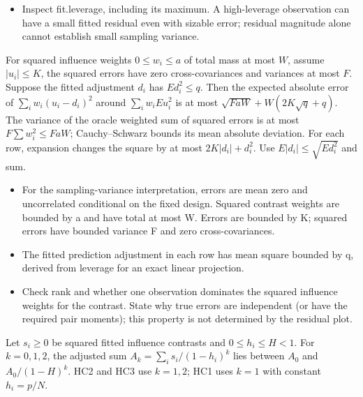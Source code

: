 \expandafter\def\csname statadic@diagnostics@STATADIC-HC-001\endcsname{\begin{itemize}
\item Inspect fit.leverage, including its maximum. A high-leverage observation can have a small fitted residual even with sizable error; residual magnitude alone cannot establish small sampling variance.
\end{itemize}}
\expandafter\def\csname statadic@statement@STATADIC-HC-002\endcsname{For squared influence weights $0\le w_i\le a$ of
  total mass at most $W$, assume $|u_i|\le K$, the squared errors have
  zero cross-covariances and variances at most $F$. Suppose the fitted
  adjustment $d_i$ has $E d_i^2\le q$. Then the expected absolute error
  of $\sum_i w_i(u_i-d_i)^2$ around $\sum_i w_iE u_i^2$ is at most
  $\sqrt{FaW}+W(2K\sqrt q+q)$.}
\expandafter\def\csname statadic@proof@STATADIC-HC-002\endcsname{The variance of the oracle weighted sum of squared errors
  is at most $F\sum w_i^2\le FaW$; Cauchy--Schwarz bounds its mean absolute
  deviation. For each row, expansion changes the square by at most
  $2K|d_i|+d_i^2$. Use $E|d_i|\le\sqrt{E d_i^2}$ and sum.}
\expandafter\def\csname statadic@assumptions@STATADIC-HC-002\endcsname{\begin{itemize}
\item For the sampling-variance interpretation, errors are mean zero and uncorrelated conditional on the fixed design. Squared contrast weights are bounded by a and have total at most W. Errors are bounded by K; squared errors have bounded variance F and zero cross-covariances.
\item The fitted prediction adjustment in each row has mean square bounded by q, derived from leverage for an exact linear projection.
\end{itemize}}
\expandafter\def\csname statadic@diagnostics@STATADIC-HC-002\endcsname{\begin{itemize}
\item Check rank and whether one observation dominates the squared influence weights for the contrast. State why true errors are independent (or have the required pair moments); this property is not determined by the residual plot.
\end{itemize}}
\expandafter\def\csname statadic@statement@STATADIC-HC-003\endcsname{Let $s_i\ge0$ be squared fitted influence contrasts and
  $0\le h_i\le H<1$. For $k=0,1,2$, the adjusted sum
  $A_k=\sum_i s_i/(1-h_i)^k$ lies between $A_0$ and $A_0/(1-H)^k$.
  HC2 and HC3 use $k=1,2$; HC1 uses $k=1$ with constant $h_i=p/N$.}

